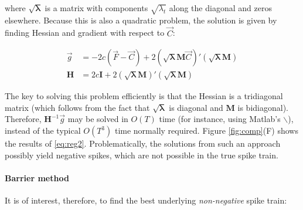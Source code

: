 \documentclass[12pt]{article}
\providecommand{\ve}[1]{\vec{#1}}
\providecommand{\ma}[1]{\boldsymbol{#1}}
\providecommand{\ve}[1]{\boldsymbol{#1}}
\newcommand{\Cav}{\ve{C}}%
\newcommand{\sml}{\sqrt{\ma{\lambda}}}
\begin{document}
\noindent where $\sml$ is a matrix with components $\sqrt{\lambda_t}$ along the diagonal and zeros elsewhere. Because this is also a quadratic problem, the solution is given by finding Hessian and gradient with respect to $\Cav$:

\begin{align}
\ve{g} &= -2c(\ve{F}-\Cav)+2 (\sml\ma{M}\Cav)'(\sml\ma{M})\\
\ma{H} &= 2c\ma{I}+2(\sml\ma{M})'(\sml\ma{M})
\end{align}

The key to solving this problem efficiently is that the Hessian is a tridiagonal matrix (which follows from the fact that $\sml$ is diagonal and $\ma{M}$ is bidiagonal).  Therefore, $\ma{H}^{-1}\ve{g}$ may be solved in $O(T)$ time (for instance, using Matlab's $\backslash$), instead of the typical $O(T^3)$ time normally required.  Figure \ref{fig:comp}(F) shows the results of \eqref{eq:reg2}.  Problematically, the solutions from such an approach possibly yield negative spikes, which are not possible in the true spike train.

\paragraph{Barrier method}

It is of interest, therefore, to find the best underlying \emph{non-negative} spike train:


\end{document}
